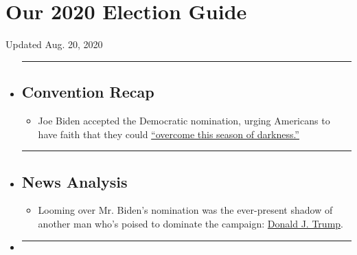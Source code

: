 \hypertarget{our-2020-election-guide}{%
\section{Our 2020 Election Guide}\label{our-2020-election-guide}}

Updated Aug. 20, 2020

\begin{itemize}
\item
  \begin{center}\rule{0.5\linewidth}{\linethickness}\end{center}

  \hypertarget{convention-recap}{%
  \subsection{Convention Recap}\label{convention-recap}}

  \begin{itemize}
  \tightlist
  \item
    Joe Biden accepted the Democratic nomination, urging Americans to
    have faith that they could
    \href{https://www.nytimes3xbfgragh.onion/2020/08/20/us/politics/Joe-Biden-accepts-democratic-nomination.html?action=click\&pgtype=Article\&state=default\&region=BELOW_MAIN_CONTENT\&context=storylines_guide}{``overcome
    this season of darkness.''}
  \end{itemize}
\item
  \begin{center}\rule{0.5\linewidth}{\linethickness}\end{center}

  \hypertarget{news-analysis}{%
  \subsection{News Analysis}\label{news-analysis}}

  \begin{itemize}
  \tightlist
  \item
    Looming over Mr. Biden's nomination was the ever-present shadow of
    another man who's poised to dominate the campaign:
    \href{https://www.nytimes3xbfgragh.onion/2020/08/20/us/politics/biden-dnc-speech-trump.html?action=click\&pgtype=Article\&state=default\&region=BELOW_MAIN_CONTENT\&context=storylines_guide}{Donald
    J. Trump}.
  \end{itemize}
\item
  \begin{center}\rule{0.5\linewidth}{\linethickness}\end{center}


\end{itemize}
